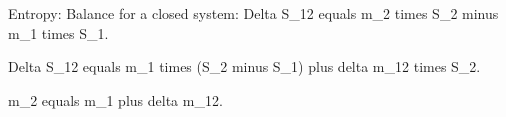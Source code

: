 Entropy: Balance for a closed system:  
Delta S_12 equals m_2 times S_2 minus m_1 times S_1.  

Delta S_12 equals m_1 times (S_2 minus S_1) plus delta m_12 times S_2.  

m_2 equals m_1 plus delta m_12.